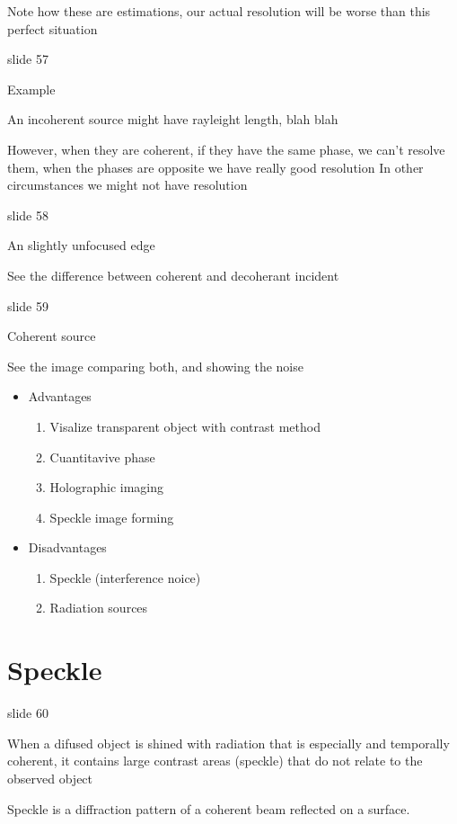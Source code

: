\documentclass[../main/main.tex]{subfiles}
\begin{document}
Note how these are estimations, our actual resolution will be worse than this perfect situation


slide 57

Example

An incoherent source might have rayleight length, blah blah

However, when they are coherent, if they have the same phase, we can't resolve them, when the phases are opposite we have really good resolution
In other circumstances we might not have resolution


slide 58

An slightly unfocused edge

See the difference between coherent and decoherant incident

slide 59

Coherent source

See the image comparing both, and showing the noise

\begin{itemize}
	\item Advantages
	      \begin{enumerate}
		      \item Visalize transparent object with contrast method
		      \item Cuantitavive phase
		      \item Holographic imaging
		      \item Speckle image forming
	      \end{enumerate}
	\item Disadvantages
	      \begin{enumerate}
		      \item Speckle (interference noice)
		      \item Radiation sources
	      \end{enumerate}
\end{itemize}


\section{Speckle}

slide 60

When a difused object is shined with radiation that is especially and temporally coherent, it contains large contrast areas (speckle) that do not relate to the observed object

Speckle is a diffraction pattern of a coherent beam reflected on a surface.
\end{document}
